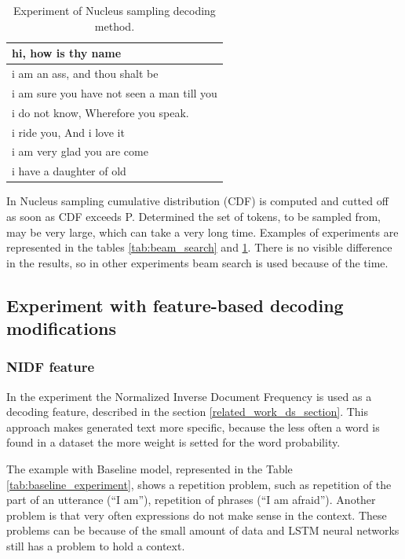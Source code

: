 \begin{table}[ht]
\centering
 \begin{tabular}{|p{14cm}|} 
 \hline\hline
  hi, how is thy name \\
 \hline
  i am an ass, and thou shalt be \\
 \hline
  i am sure you have not seen a man till you \\
 \hline 
  i do not know, Wherefore you speak. \\
 \hline 
 i ride you, And i love it \\
 \hline 
 i am very glad you are come \\
 \hline 
 i have a daughter of old \\
 \hline\hline
 \end{tabular}
 \caption{Experiment of Nucleus sampling decoding method.}
\label{tab:nucleus_sampling}
\end{table}

In Nucleus sampling cumulative distribution (CDF) is computed and cutted off as soon as CDF exceeds P. Determined the set of tokens, to be sampled from, may be very large, which can take a very long time. Examples of experiments are represented in the tables \ref{tab:beam_search} and \ref{tab:nucleus_sampling}. There is no visible difference in the results, so in other experiments beam search is used because of the time.

\subsection{Experiment with feature-based decoding modifications}
\subsubsection{NIDF feature}
In the experiment the Normalized Inverse Document Frequency is used as a decoding feature, described in the section \ref{related_work_ds_section}. This approach makes generated text more specific, because the less often a word is found in a dataset the more weight is setted for the word probability. 

The example with Baseline model, represented in the Table \ref{tab:baseline_experiment}, shows a repetition problem, such as repetition of the part of an utterance (``I am''), repetition of phrases (``I am afraid''). Another problem is that very often expressions do not make sense in the context. These problems can be because of the small amount of data and LSTM neural networks still has a problem to hold a context.

